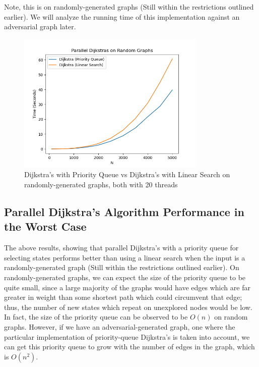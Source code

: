 \documentclass[conference]{IEEEtran}
\begin{document}
Note, this is on randomly-generated graphs (Still within the restrictions outlined earlier). We will analyze the running time of this implementation against an adversarial graph later. 

\break
\break

\begin{figure}[t]
    
\end{figure}


\begin{figure}[h]
    \centering
    \includegraphics[width=9cm]{images/benchdijkstra.png}
    \caption{Dijkstra's with Priority Queue vs Dijkstra's with Linear Search on randomly-generated graphs, both with 20 threads}
    \label{fig:dijkstra_both}
\end{figure}

\subsection{Parallel Dijkstra's Algorithm Performance in the Worst Case}\label{AA}
The above results, showing that parallel Dijkstra's with a priority queue for selecting states performs better than using a linear search when the input is a randomly-generated graph (Still within the restrictions outlined earlier). On randomly-generated graphs, we can expect the size of the priority queue to be quite small, since a large majority of the graphs would have edges which are far greater in weight than some shortest path which could circumvent that edge; thus, the number of new states which repeat on unexplored nodes would be low. In fact, the size of the priority queue can be observed to be $O(n)$ on random graphs. However, if we have an adversarial-generated graph, one where the particular implementation of priority-queue Dijkstra's is taken into account, we can get this priority queue to grow with the number of edges in the graph, which is $O(n^2)$. 
\end{document}
